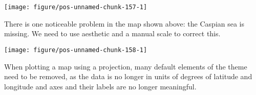 \documentclass[paper=a4,10pt,div=17,headsepline,BCOR=12mm,twoside,open=right]{scrbook}\usepackage{knitr}
\begin{document}
\begin{knitrout}\footnotesize
{}\color{fgcolor}\begin{kframe}
\begin{alltt}
   \hlopt{+}
  \hlstd{()} \hlopt{+}
  \hlstd{(}\hlstd{=}\hlstd{)} \hlopt{+}
  \hlstd{()}
\end{alltt}
\end{kframe}

{\centering \texttt{[image: figure/pos-unnamed-chunk-157-1]} 

}



\end{knitrout}

There is one noticeable problem in the map shown above: the Caspian sea is missing. We need to use aesthetic  and a manual scale to correct this.

\begin{knitrout}\footnotesize
{}\color{fgcolor}\begin{kframe}
\begin{alltt}
    \hlopt{+}
  \hlstd{()} \hlopt{+}
  \hlstd{(}\hlstd{=}\hlstd{)} \hlopt{+}
  \hlstd{(}\hlstd{=}\hlstd{(}\hlstd{,} \hlstd{),}
                    \hlstd{=}\hlstd{)} \hlopt{+}
  \hlstd{()}
\end{alltt}
\end{kframe}

{\centering \texttt{[image: figure/pos-unnamed-chunk-158-1]} 

}



\end{knitrout}




When plotting a map using a projection, many default elements of the  theme need to be removed, as the data is no longer in units of degrees of latitude and longitude and axes and their labels are no longer meaningful.
\end{document}
